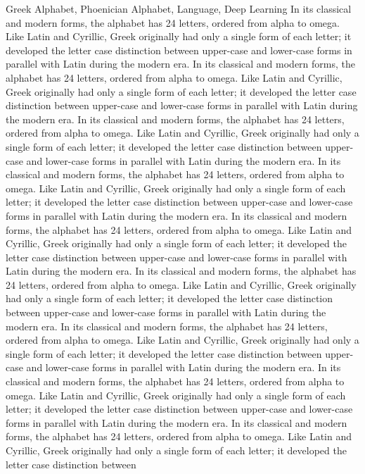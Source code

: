 \documentclass[doctor]{dutthesis} %
\begin{document}
\begin{englishabstract}{Greek Alphabet, Phoenician Alphabet, Language, Deep Learning}
In its classical and modern forms, the alphabet has 24 letters, ordered from
alpha to omega. Like Latin and Cyrillic, Greek originally had only a single
form of each letter; it developed the letter case distinction between
upper-case and lower-case forms in parallel with Latin during the modern era.
In its classical and modern forms, the alphabet has 24 letters, ordered from
alpha to omega. Like Latin and Cyrillic, Greek originally had only a single
form of each letter; it developed the letter case distinction between
upper-case and lower-case forms in parallel with Latin during the modern era.
In its classical and modern forms, the alphabet has 24 letters, ordered from
alpha to omega. Like Latin and Cyrillic, Greek originally had only a single
form of each letter; it developed the letter case distinction between
upper-case and lower-case forms in parallel with Latin during the modern era.
In its classical and modern forms, the alphabet has 24 letters, ordered from
alpha to omega. Like Latin and Cyrillic, Greek originally had only a single
form of each letter; it developed the letter case distinction between
upper-case and lower-case forms in parallel with Latin during the modern era.
In its classical and modern forms, the alphabet has 24 letters, ordered from
alpha to omega. Like Latin and Cyrillic, Greek originally had only a single
form of each letter; it developed the letter case distinction between
upper-case and lower-case forms in parallel with Latin during the modern era.
In its classical and modern forms, the alphabet has 24 letters, ordered from
alpha to omega. Like Latin and Cyrillic, Greek originally had only a single
form of each letter; it developed the letter case distinction between
upper-case and lower-case forms in parallel with Latin during the modern era.
In its classical and modern forms, the alphabet has 24 letters, ordered from
alpha to omega. Like Latin and Cyrillic, Greek originally had only a single
form of each letter; it developed the letter case distinction between
upper-case and lower-case forms in parallel with Latin during the modern era.
In its classical and modern forms, the alphabet has 24 letters, ordered from
alpha to omega. Like Latin and Cyrillic, Greek originally had only a single
form of each letter; it developed the letter case distinction between
upper-case and lower-case forms in parallel with Latin during the modern era.
In its classical and modern forms, the alphabet has 24 letters, ordered from
alpha to omega. Like Latin and Cyrillic, Greek originally had only a single
form of each letter; it developed the letter case distinction between

\end{englishabstract}
\end{document}

